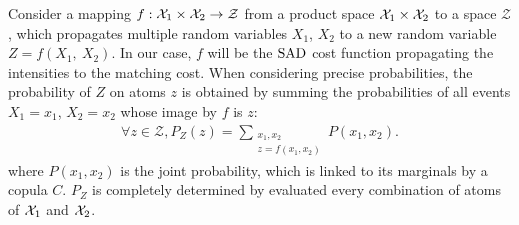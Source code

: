 Consider a mapping $f:\mathcal{X}_1\times\mathcal{X}_2\rightarrow\mathcal{Z}$ from a product space $\mathcal{X}_1\times\mathcal{X}_2$ to a space $\mathcal{Z}$, which propagates multiple random variables $X_1$, $X_2$ to a new random variable $Z=f(X_1, ~X_2)$. In our case, $f$ will be the $\mathrm{SAD}$ cost function propagating the intensities to the matching cost. When considering precise probabilities, the probability of $Z$ on atoms $z$ is obtained by summing the probabilities of all events $X_1=x_1$, $X_2=x_2$ whose image by $f$ is $z$: 
\begin{align}\label{eq:precise_propagate_proba}
    \forall z\in\mathcal{Z}, P_Z(z)=\sum_{\substack{x_1,x_2\\z=f(x_1,x_2)}}P(x_1,x_2).
\end{align}
where $P(x_1,x_2)$ is the joint probability, which is linked to its marginals by a copula $C$. $P_Z$ is completely determined by evaluated every combination of atoms of $\mathcal{X}_1$ and $\mathcal{X}_2$.

